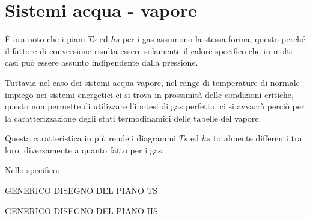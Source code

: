 \section{Sistemi acqua - vapore}
\begin{adjustwidth}{2in}{}
	È ora noto che i piani $Ts$ ed $hs$ per i gas assumono la stessa forma, questo perché il fattore di conversione risulta essere solamente il calore specifico che in molti casi può essere assunto indipendente dalla pressione. \newline
	
	Tuttavia nel caso dei sistemi acqua vapore, nel range di temperature di normale impiego nei sistemi energetici ci si trova in prossimità delle condizioni critiche, questo non permette di utilizzare l'ipotesi di gas perfetto, ci si avvarrà perciò per la caratterizzazione degli stati termodinamici delle tabelle del vapore.
	
	Questa caratteristica in più rende i diagrammi $Ts$ ed $hs$ totalmente differenti tra loro, diversamente a quanto fatto per i gas. 
	
	Nello specifico:
	
	GENERICO DISEGNO DEL PIANO TS
	
	GENERICO DISEGNO DEL PIANO HS 
\end{adjustwidth}
\newpage
